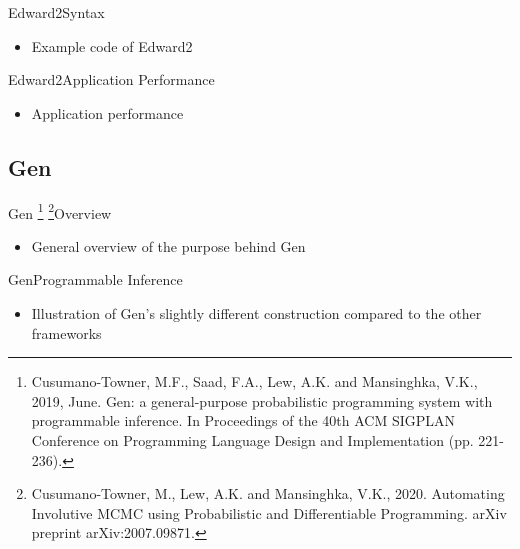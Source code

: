 \documentclass[AERbeamer%
              ,optEnglish%
              ,optBiber%
              ,optBibstyleAlphabetic%
              ,optBeamerClassicFormat%
              ]{AERlatex}%
\begin{document}
\begin{frame}[c]{Edward2}{Syntax}
    \centering
    \begin{itemize}
        \item Example code of Edward2
    \end{itemize}
\end{frame}


\begin{frame}[c]{Edward2}{Application Performance}
    \centering
    \begin{itemize}
        \item Application performance
    \end{itemize}
\end{frame}


\subsection{Gen}
\begin{frame}[c]{Gen \footnote{Cusumano-Towner, M.F., Saad, F.A., Lew, A.K. and Mansinghka, V.K., 2019, June. Gen: a general-purpose
                               probabilistic programming system with programmable inference. In Proceedings of the 40th ACM SIGPLAN
                               Conference on Programming Language Design and Implementation (pp. 221-236).}
                     \footnote{Cusumano-Towner, M., Lew, A.K. and Mansinghka, V.K., 2020. Automating Involutive MCMC using
                               Probabilistic and Differentiable Programming. arXiv preprint arXiv:2007.09871.}}{Overview}
    \centering
    \begin{itemize} %
        \item General overview of the purpose behind Gen
    \end{itemize}
\end{frame}


\begin{frame}[c]{Gen}{Programmable Inference}
    \centering
    \begin{itemize}
        \item Illustration of Gen's slightly different construction compared to the other frameworks
    \end{itemize}
\end{frame}
\end{document}
